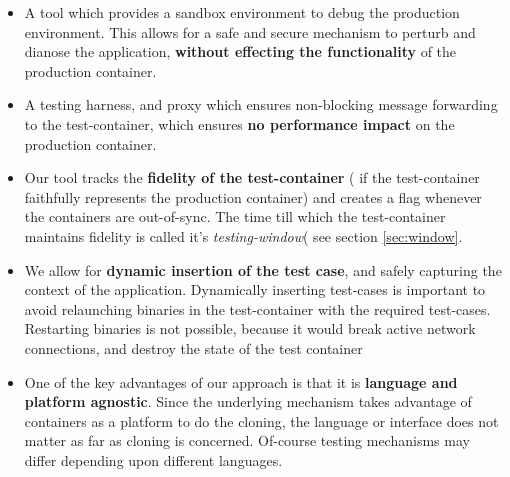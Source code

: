 \begin{itemize}

\item A tool which provides a sandbox environment to debug the production environment. 
This allows for a safe and secure mechanism to perturb and dianose the application, \textbf{without effecting the functionality} of the  production container.

\item A testing harness, and proxy which ensures non-blocking message forwarding to the test-container, which ensures \textbf{no performance impact} on the production container. 

\item Our tool tracks the \textbf{fidelity of the test-container} ( if the test-container faithfully represents the production container) and creates a flag whenever the containers are out-of-sync. 
The time till which the test-container maintains fidelity is called it's \emph{testing-window}( see section \ref{sec:window}.

\item We allow for \textbf{dynamic insertion of the test case}, and safely capturing the context of the application. 
Dynamically inserting test-cases is important to avoid relaunching binaries in the test-container with the required test-cases. 
Restarting binaries is not possible, because it would break active network connections, and destroy the state of the test container

\item One of the key advantages of our approach is that it is \textbf{language and platform agnostic}. 
Since the underlying mechanism takes advantage of containers as a platform to do the cloning, the language or interface does not matter as far as cloning is concerned. 
Of-course testing mechanisms may differ depending upon different languages.

\end{itemize}




